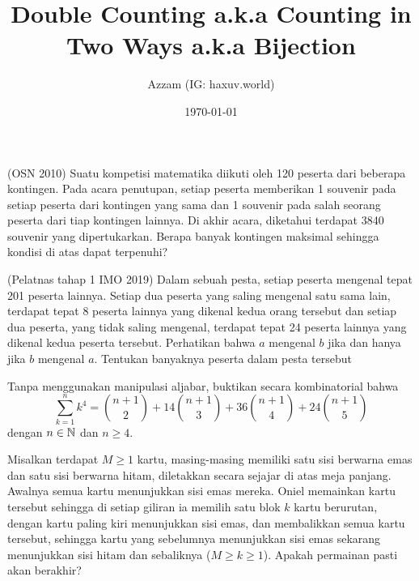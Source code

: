 \documentclass[12pt]{scrartcl}
\title{Double Counting a.k.a Counting in Two Ways a.k.a Bijection}
\author{Azzam (IG: haxuv.world)}
\date{\today}
\begin{document}
\maketitle

\renewcommand*\contentsname{Daftar Isi}
\tableofcontents

\newpage

\begin{soaljawab}
    (OSN 2010) Suatu kompetisi matematika diikuti oleh 120 peserta dari beberapa kontingen. Pada acara penutupan, setiap peserta memberikan 1 souvenir pada setiap peserta dari kontingen yang sama dan 1 souvenir pada salah seorang peserta dari tiap kontingen lainnya. Di akhir acara, diketahui terdapat 3840 souvenir yang dipertukarkan. Berapa banyak kontingen maksimal sehingga kondisi di atas dapat terpenuhi?
\end{soaljawab}

\begin{soaljawab}
    (Pelatnas tahap 1 IMO 2019) Dalam sebuah pesta, setiap peserta mengenal tepat 201 peserta lainnya. Setiap dua peserta yang saling mengenal satu sama lain, terdapat tepat 8 peserta lainnya yang dikenal kedua orang tersebut dan setiap dua peserta, yang tidak saling mengenal, terdapat tepat 24 peserta lainnya yang dikenal kedua peserta tersebut. Perhatikan bahwa $a$ mengenal $b$ jika dan hanya jika $b$ mengenal $a$. Tentukan banyaknya peserta dalam pesta tersebut
\end{soaljawab}

\begin{soaljawab}
    Tanpa menggunakan manipulasi aljabar, buktikan secara kombinatorial bahwa
    $$\sum_{k=1}^{n} k^4 = {n+1 \choose 2} + 14{n+1 \choose 3}+36{n+1 \choose 4}+24{n+1 \choose 5}$$ dengan $n\in \mathbb N$ dan $n \ge 4$.
\end{soaljawab}

\begin{soaljawab}
Misalkan terdapat $M \ge 1$ kartu, masing-masing memiliki satu sisi berwarna emas dan satu sisi berwarna hitam, diletakkan secara sejajar di atas meja panjang. Awalnya semua kartu menunjukkan sisi emas mereka. Oniel memainkan kartu tersebut sehingga di setiap giliran ia memilih satu blok $k$ kartu berurutan, dengan kartu paling kiri menunjukkan sisi emas, dan membalikkan semua kartu tersebut, sehingga kartu yang sebelumnya menunjukkan sisi emas sekarang menunjukkan sisi hitam dan sebaliknya ($M \ge k \ge 1$). Apakah permainan pasti akan berakhir?
\end{soaljawab}
\end{document}
